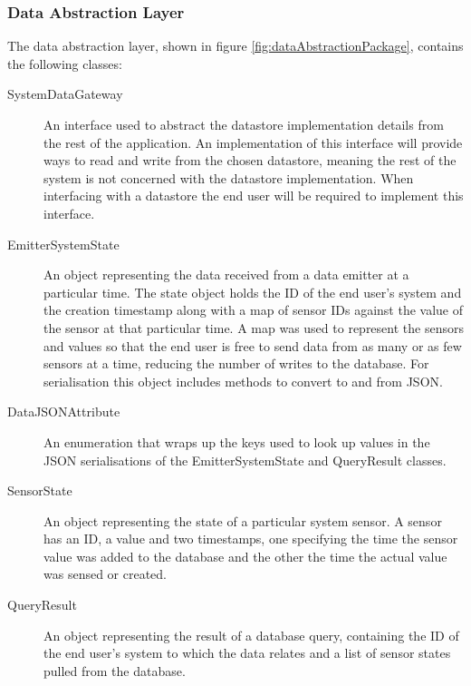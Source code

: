 \documentclass[10pt,a4paper]{article}
\begin{document}
\subsubsection{Data Abstraction Layer}

The data abstraction layer, shown in figure
\ref{fig:dataAbstractionPackage}, contains the following classes:

\begin{description}
  \item [SystemDataGateway] An interface used to abstract the
    datastore implementation details from the rest of the
    application. An implementation of this interface will provide ways
    to read and write from the chosen datastore, meaning the rest of the
    system is not concerned with the datastore implementation. When
    interfacing with a datastore the end user will be required to
    implement this interface.

  \item [EmitterSystemState] An object representing the data received
    from a data emitter at a particular time. The state object holds
    the ID of the end user's system and the creation timestamp along
    with a map of sensor IDs against the value of the sensor at that
    particular time. A map was used to represent the sensors and
    values so that the end user is free to send data from as many or
    as few sensors at a time, reducing the number of writes to the
    database. For serialisation this object includes methods to
    convert to and from JSON.

  \item [DataJSONAttribute] An enumeration that wraps up the keys used
    to look up values in the JSON serialisations of the
    EmitterSystemState and QueryResult classes.

  \item [SensorState] An object representing the state of a particular
    system sensor. A sensor has an ID, a value and two timestamps, one
    specifying the time the sensor value was added to the database and
    the other the time the actual value was sensed or created.

  \item [QueryResult] An object representing the result of a database
    query, containing the ID of the end user's system to which the
    data relates and a list of sensor states pulled from the database.
\end{description}
\end{document}

